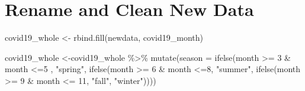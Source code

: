 \documentclass[
]{book}
\newenvironment{Shaded}{\begin{snugshade}}{\end{snugshade}}
\newcommand{\AttributeTok}[1]{\textcolor[rgb]{0.77,0.63,0.00}{#1}}
\newcommand{\DecValTok}[1]{\textcolor[rgb]{0.00,0.00,0.81}{#1}}
\newcommand{\FunctionTok}[1]{\textcolor[rgb]{0.00,0.00,0.00}{#1}}
\newcommand{\NormalTok}[1]{#1}
\newcommand{\OtherTok}[1]{\textcolor[rgb]{0.56,0.35,0.01}{#1}}
\newcommand{\SpecialCharTok}[1]{\textcolor[rgb]{0.00,0.00,0.00}{#1}}
\newcommand{\StringTok}[1]{\textcolor[rgb]{0.31,0.60,0.02}{#1}}
\begin{document}
\hypertarget{rename-and-clean-new-data}{%
\section{Rename and Clean New Data}\label{rename-and-clean-new-data}}

\begin{Shaded}
\end{Shaded}

\begin{Shaded}
\begin{Highlighting}[]
\NormalTok{covid19\_whole }\OtherTok{\textless{}{-}} \FunctionTok{rbind.fill}\NormalTok{(newdata, covid19\_month)}
\end{Highlighting}
\end{Shaded}

\begin{Shaded}
\begin{Highlighting}[]
\NormalTok{covid19\_whole }\OtherTok{\textless{}{-}}\NormalTok{covid19\_whole }\SpecialCharTok{\%\textgreater{}\%}
  \FunctionTok{mutate}\NormalTok{(}\AttributeTok{season =} \FunctionTok{ifelse}\NormalTok{(month }\SpecialCharTok{\textgreater{}=} \DecValTok{3} \SpecialCharTok{\&}\NormalTok{ month }\SpecialCharTok{\textless{}=}\DecValTok{5}\NormalTok{ , }\StringTok{"spring"}\NormalTok{, }\FunctionTok{ifelse}\NormalTok{(month }\SpecialCharTok{\textgreater{}=} \DecValTok{6} \SpecialCharTok{\&}\NormalTok{ month }\SpecialCharTok{\textless{}=}\DecValTok{8}\NormalTok{, }\StringTok{"summer"}\NormalTok{, }\FunctionTok{ifelse}\NormalTok{(month }\SpecialCharTok{\textgreater{}=} \DecValTok{9} \SpecialCharTok{\&}\NormalTok{ month }\SpecialCharTok{\textless{}=} \DecValTok{11}\NormalTok{, }\StringTok{"fall"}\NormalTok{, }\StringTok{"winter"}\NormalTok{))))}
\end{Highlighting}
\end{Shaded}
\end{document}

